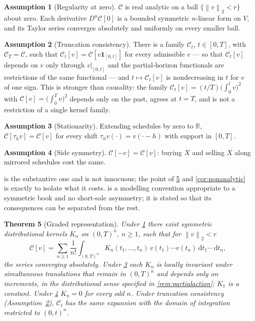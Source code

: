 \documentclass[11pt]{article}
\newcommand{\norm}[1]{\left\lVert #1\right\rVert}
\numberwithin{equation}{section}
\newtheorem{theorem}{Theorem}[section]
\theoremstyle{definition}
\theoremstyle{remark}
\newcommand{\R}{\mathbb{R}}
\theoremstyle{definition}
\newtheorem{assumption}[theorem]{Assumption}
\newcommand{\dd}{\,\mathrm d}
\begin{document}
\begin{assumption}[Regularity at zero]\label{ax:analytic}
$\mathcal C$ is real analytic on a ball $\{\norm v_2<r\}$ about zero.
Each derivative $D^n\mathcal C[0]$ is a bounded symmetric $n$-linear form on
$V$, and its Taylor series converges absolutely and uniformly on every
smaller ball.
\end{assumption}

\begin{assumption}[Truncation consistency]\label{ass:trunc}
There is a family $\mathcal C_t$, $t\in[0,T]$, with $\mathcal C_T=\mathcal C$,
such that $\mathcal C_t[v]=\mathcal C[v\mathbf 1_{[0,t]}]$ for every admissible
$v$ --- so that $\mathcal C_t[v]$ depends on $v$ only through $v|_{[0,t]}$ and
the partial-horizon functionals are restrictions of the same functional --- and
$t\mapsto\mathcal C_t[v]$ is nondecreasing in $t$ for $v$ of one sign.
This is stronger than causality: the family
$\mathcal C_t[v]=(t/T)\bigl(\int_0^t v\bigr)^2$ with
$\mathcal C[v]=\bigl(\int_0^T v\bigr)^2$ depends only on the past,
agrees at $t=T$, and is not a restriction of a single kernel family.
\end{assumption}

\begin{assumption}[Stationarity]\label{ax:stat}
Extending schedules by zero to $\R$, $\mathcal C[\tau_h v]=\mathcal C[v]$ for
every shift $\tau_hv(\cdot)=v(\cdot-h)$ with support in $[0,T]$.
\end{assumption}

\begin{assumption}[Side symmetry]\label{ax:symm}
$\mathcal C[-v]=\mathcal C[v]$: buying $X$ and selling $X$ along mirrored
schedules cost the same.
\end{assumption}

 is the substantive one and is not innocuous; the point of
\cref{thm:hierarchy} and \cref{cor:nonanalytic} is exactly to isolate what it
costs.  is a modelling convention appropriate to a symmetric
book and no short-sale asymmetry; it is stated so that its consequences can be
separated from the rest.

\begin{theorem}[Graded representation]\label{thm:hierarchy}
Under \cref{ax:analytic} there exist symmetric distributional kernels $K_n$ on
$(0,T)^n$, $n\geq1$, such that for $\norm v_2<r$
\begin{equation}\label{eq:volterra}
 \mathcal C[v]=\sum_{n\geq1}\frac1{n!}\int_{(0,T)^n}
 K_n(t_1,\dots,t_n)\,v(t_1)\cdots v(t_n)\dd t_1\cdots\dd t_n ,
\end{equation}
the series converging absolutely. Under \cref{ax:stat} each $K_n$ is locally
invariant under simultaneous translations that remain in $(0,T)^n$ and
depends only on increments, in the distributional sense specified in
\cref{rem:partialaction}; $K_1$ is a constant. Under \cref{ax:symm} $K_n=0$ for
every odd $n$. Under truncation consistency (Assumption~\ref{ass:trunc}),
$\mathcal C_t$ has the same expansion
with the domain of integration restricted to $(0,t)^n$.
\end{theorem}
\end{document}
